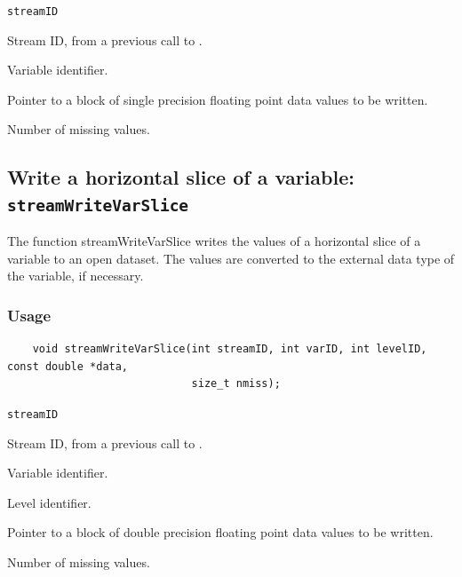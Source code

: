 \hspace*{4mm}\begin{minipage}[]{15cm}
\begin{deflist}{\texttt{streamID}\ }
\item[\texttt{streamID}]
Stream ID, from a previous call to {}.
\item[\texttt{varID}]
Variable identifier.
\item[\texttt{data}]
Pointer to a block of single precision floating point data values to be written.
\item[\texttt{nmiss}]
Number of missing values.

\end{deflist}
\end{minipage}


\subsection{Write a horizontal slice of a variable: \texttt{streamWriteVarSlice}}
\label{streamWriteVarSlice}

The function streamWriteVarSlice writes the values of a horizontal slice of a variable to an open dataset.
The values are converted to the external data type of the variable, if necessary.
\subsubsection*{Usage}

\begin{verbatim}
    void streamWriteVarSlice(int streamID, int varID, int levelID, const double *data, 
                             size_t nmiss);
\end{verbatim}

\hspace*{4mm}\begin{minipage}[]{15cm}
\begin{deflist}{\texttt{streamID}\ }
\item[\texttt{streamID}]
Stream ID, from a previous call to {}.
\item[\texttt{varID}]
Variable identifier.
\item[\texttt{levelID}]
Level identifier.
\item[\texttt{data}]
Pointer to a block of double precision floating point data values to be written.
\item[\texttt{nmiss}]
Number of missing values.

\end{deflist}
\end{minipage}


